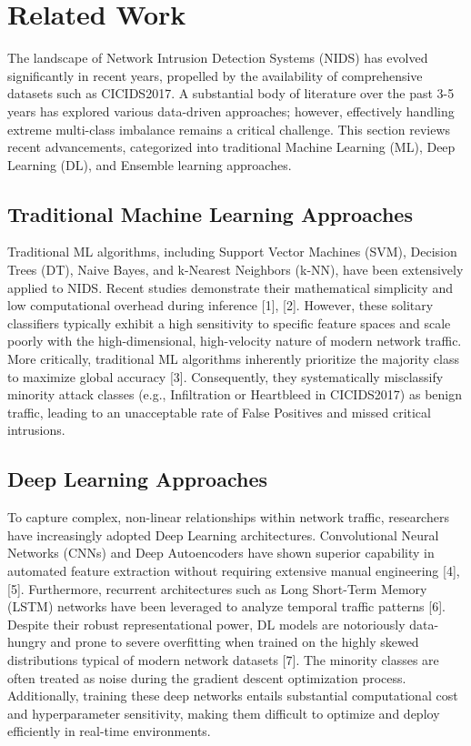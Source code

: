 \section{Related Work}
The landscape of Network Intrusion Detection Systems (NIDS) has evolved significantly in recent years, propelled by the availability of comprehensive datasets such as CICIDS2017. A substantial body of literature over the past 3-5 years has explored various data-driven approaches; however, effectively handling extreme multi-class imbalance remains a critical challenge. This section reviews recent advancements, categorized into traditional Machine Learning (ML), Deep Learning (DL), and Ensemble learning approaches.

\subsection{Traditional Machine Learning Approaches}
Traditional ML algorithms, including Support Vector Machines (SVM), Decision Trees (DT), Naive Bayes, and k-Nearest Neighbors (k-NN), have been extensively applied to NIDS. Recent studies demonstrate their mathematical simplicity and low computational overhead during inference [1], [2]. However, these solitary classifiers typically exhibit a high sensitivity to specific feature spaces and scale poorly with the high-dimensional, high-velocity nature of modern network traffic. More critically, traditional ML algorithms inherently prioritize the majority class to maximize global accuracy [3]. Consequently, they systematically misclassify minority attack classes (e.g., Infiltration or Heartbleed in CICIDS2017) as benign traffic, leading to an unacceptable rate of False Positives and missed critical intrusions.

\subsection{Deep Learning Approaches}
To capture complex, non-linear relationships within network traffic, researchers have increasingly adopted Deep Learning architectures. Convolutional Neural Networks (CNNs) and Deep Autoencoders have shown superior capability in automated feature extraction without requiring extensive manual engineering [4], [5]. Furthermore, recurrent architectures such as Long Short-Term Memory (LSTM) networks have been leveraged to analyze temporal traffic patterns [6]. Despite their robust representational power, DL models are notoriously data-hungry and prone to severe overfitting when trained on the highly skewed distributions typical of modern network datasets [7]. The minority classes are often treated as noise during the gradient descent optimization process. Additionally, training these deep networks entails substantial computational cost and hyperparameter sensitivity, making them difficult to optimize and deploy efficiently in real-time environments.

